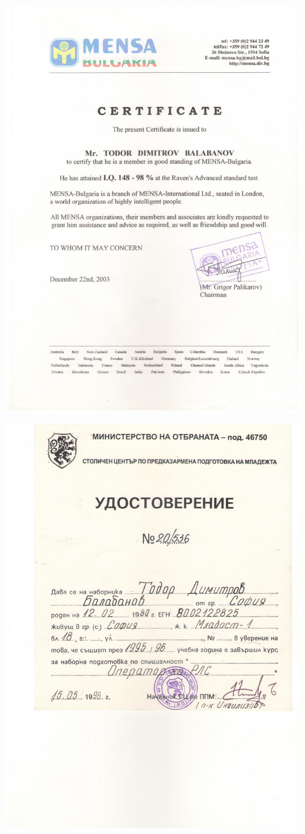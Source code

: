 \documentclass[english,a4paper]{europasscv}
\begin{document}
\includegraphics[width=\textwidth,height=\textheight,keepaspectratio]{Mensa2003}


\includegraphics[width=\textwidth,height=\textheight,keepaspectratio]{MO1996}
\end{document}
